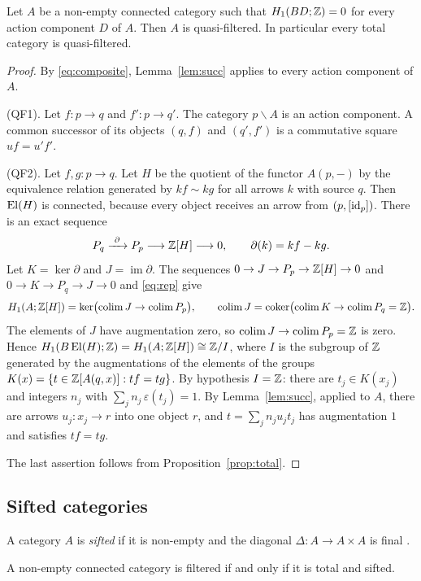 \begin{proposition}\label{prop:qf}
Let $A$ be a non-empty connected category such that $H_1(BD;\mathbb{Z})=0$ for every
action component $D$ of $A$. Then $A$ is quasi-filtered. In particular every
total category is quasi-filtered.
\end{proposition}

\begin{proof}
By \eqref{eq:composite}, Lemma~\ref{lem:succ} applies to every action
component of $A$.

(QF1). Let $f\colon p\to q$ and $f'\colon p\to q'$. The category
$p\backslash A$ is an action component. A common successor of its objects
$(q,f)$ and $(q',f')$ is a commutative square $uf=u'f'$.

(QF2). Let $f,g\colon p\to q$. Let $H$ be the quotient of the functor
$A(p,-)$ by the equivalence relation generated by $kf\sim kg$ for all arrows
$k$ with source $q$. Then $\operatorname{El}(H)$ is connected, because every object
receives an arrow from $(p,[\mathrm{id}_p])$. There is an exact sequence
\[
 P_q\xrightarrow{\ \partial\ }P_p\longrightarrow\Z[H]\longrightarrow 0,
 \qquad\partial(k)=kf-kg .
\]
Let $K=\ker\partial$ and $J=\operatorname{im}\partial$. The sequences
$0\to J\to P_p\to\mathbb{Z}[H]\to0$ and $0\to K\to P_q\to J\to 0$ and \eqref{eq:rep}
give
\[
 H_1(A;\mathbb{Z}[H])=\ker\bigl(\operatorname{colim} J\to\operatorname{colim} P_p\bigr),\qquad
 \operatorname{colim} J=\operatorname{coker}\bigl(\operatorname{colim} K\to\operatorname{colim} P_q=\mathbb{Z}\bigr).
\]
The elements of $J$ have augmentation zero, so $\operatorname{colim} J\to\operatorname{colim} P_p=\mathbb{Z}$ is
zero. Hence $H_1(B\operatorname{El}(H);\mathbb{Z})=H_1(A;\mathbb{Z}[H])\cong\mathbb{Z}/I$, where $I$ is the subgroup
of $\mathbb{Z}$ generated by the augmentations of the elements of the groups
$K(x)=\{t\in\mathbb{Z}[A(q,x)]:tf=tg\}$. By hypothesis $I=\mathbb{Z}$: there are
$t_j\in K(x_j)$ and integers $n_j$ with $\sum_jn_j\,\varepsilon(t_j)=1$. By
Lemma~\ref{lem:succ}, applied to $A$, there are arrows $u_j\colon x_j\to r$
into one object $r$, and $t=\sum_jn_ju_jt_j$ has augmentation $1$ and
satisfies $tf=tg$.

The last assertion follows from Proposition~\ref{prop:total}.
\end{proof}

\subsection{Sifted categories}

A category $A$ is \emph{sifted} if it is non-empty and the diagonal
$\Delta\colon A\to A\times A$ is final \cite{AR}.

\begin{proposition}\label{prop:sifted}
A non-empty connected category is filtered if and only if it is total and
sifted.
\end{proposition}


